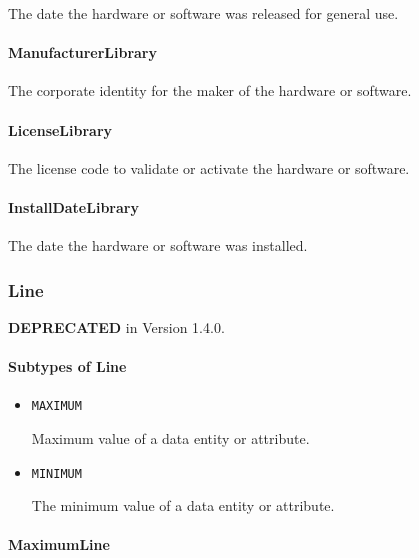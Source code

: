 The date the hardware or software was released for general use.



\paragraph{ManufacturerLibrary}\mbox{}
\label{sec:ManufacturerLibrary}


The corporate identity for the maker of the hardware or software.



\paragraph{LicenseLibrary}\mbox{}
\label{sec:LicenseLibrary}


The license code to validate or activate the hardware or software.


\paragraph{InstallDateLibrary}\mbox{}
\label{sec:InstallDateLibrary}


The date the hardware or software was installed.


\subsubsection{Line}
\label{sec:Line}



\textbf{DEPRECATED} in Version 1.4.0.


\paragraph{Subtypes of Line}\mbox{}
\label{sec:Subtypes of Line}

\begin{itemize}

\item \texttt{MAXIMUM}


Maximum value of a data entity or attribute.

\item \texttt{MINIMUM}


The minimum value of a data entity or attribute.


\end{itemize}

\paragraph{MaximumLine}\mbox{}
\label{sec:MaximumLine}


